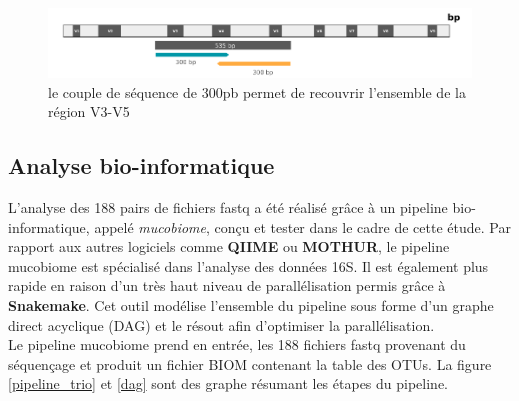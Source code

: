 \documentclass[12pt,a4paper]{article}
\begin{document}
\begin{figure}[ht]
\begin{center}
\includegraphics[scale=0.6]{img/illumina.png}\hfill
\end{center}
\caption{le couple de séquence de 300pb permet de recouvrir l'ensemble de la région V3-V5}
\label{illumina}
\end{figure}


\subsection{Analyse bio-informatique}

L’analyse des 188 pairs de fichiers fastq a été réalisé grâce à un pipeline bio-informatique, appelé \textit{mucobiome}, conçu et tester dans le cadre de cette étude. Par rapport aux autres logiciels comme \textbf{QIIME} ou \textbf{MOTHUR}, le pipeline mucobiome est spécialisé dans l’analyse des données 16S. Il est également plus rapide en raison d’un très haut niveau de parallélisation permis grâce à  \textbf{Snakemake}. Cet outil modélise l'ensemble du pipeline sous forme d'un graphe direct acyclique (DAG) et le résout afin d'optimiser la parallélisation. \\
Le pipeline mucobiome prend en entrée, les 188 fichiers fastq provenant du séquençage et produit un fichier BIOM contenant la table des OTUs. La figure \ref{pipeline_trio} et \ref{dag} sont des graphe résumant les étapes du pipeline.
\end{document}
